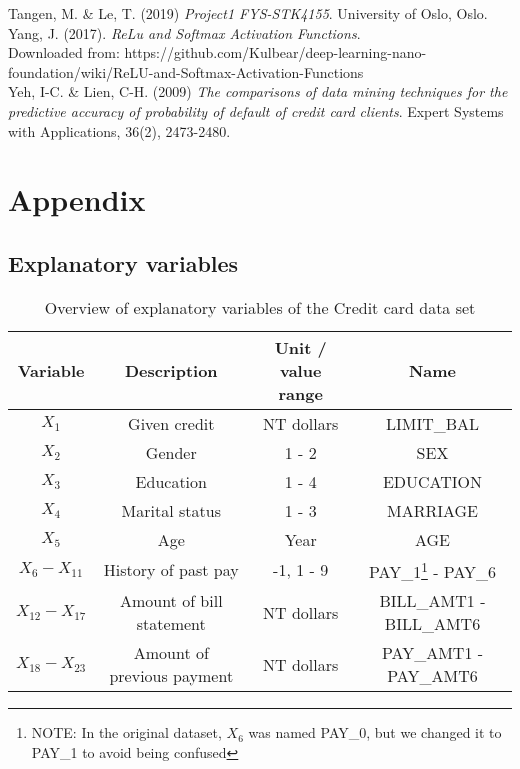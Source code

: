 \documentclass[11pt,english, A4]{article}
\begin{document}
Tangen, M. \& Le, T. (2019) \textit{Project1 FYS-STK4155}. University of Oslo, Oslo.\\

Yang, J. (2017). \textit{ReLu and Softmax Activation Functions}. \\
Downloaded from: https://github.com/Kulbear/deep-learning-nano-foundation/wiki/ReLU-and-Softmax-Activation-Functions\\

Yeh, I-C. \& Lien, C-H. (2009) \textit{The comparisons of data mining techniques for the predictive accuracy of probability of default of credit card clients}. Expert Systems with Applications, 36(2), 2473-2480.\\

\newpage


\section{Appendix}


\subsection{Explanatory variables}


\begin{table}[H]
   \centering
   \begin{tabular}{ c | c | c | c} \label{tab:EXPVar}
   Variable & Description & Unit / value range & Name\\
   \hline
   $X_{1}$ & Given credit & NT dollars & LIMIT\_BAL\\
   $X_{2}$ & Gender & 1 - 2 & SEX \\
   $X_{3}$ & Education & 1 - 4 & EDUCATION \\
   $X_{4}$ & Marital status & 1 - 3 & MARRIAGE \\
   $X_{5}$ & Age & Year & AGE \\
   $X_{6} - X_{11}$ & History of past pay & -1, 1 - 9 & PAY\_1\footnote{NOTE: In the original dataset, $X_{6}$ was named    PAY\_0, but we changed it to PAY\_1 to avoid being confused} - PAY\_6 \\
   $X_{12} - X_{17}$ & Amount of bill statement & NT dollars & BILL\_AMT1 - BILL\_AMT6 \\
   $X_{18} - X_{23}$ & Amount of previous payment & NT dollars & PAY\_AMT1 - PAY\_AMT6
  \end{tabular}
  \caption{Overview of explanatory variables of the Credit card data set}
\end{table}
\end{document}
